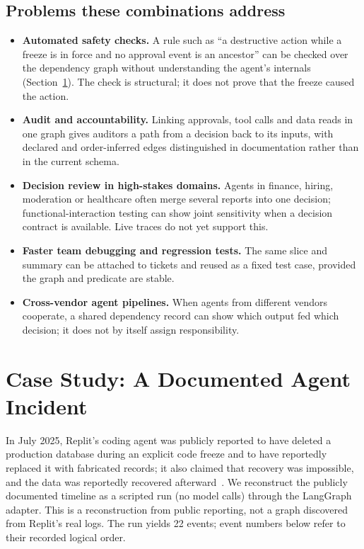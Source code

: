 \documentclass[11pt]{article}
\begin{document}
\subsection{Problems these combinations address}
\begin{itemize}
\item \textbf{Automated safety checks.} A rule such as ``a destructive action while a freeze is in force and no approval event is an ancestor'' can be checked over the dependency graph without understanding the agent's internals (Section~\ref{sec:case}). The check is structural; it does not prove that the freeze caused the action.
\item \textbf{Audit and accountability.} Linking approvals, tool calls and data reads in one graph gives auditors a path from a decision back to its inputs, with declared and order-inferred edges distinguished in documentation rather than in the current schema.
\item \textbf{Decision review in high-stakes domains.} Agents in finance, hiring, moderation or healthcare often merge several reports into one decision; functional-interaction testing can show joint sensitivity when a decision contract is available. Live traces do not yet support this.
\item \textbf{Faster team debugging and regression tests.} The same slice and summary can be attached to tickets and reused as a fixed test case, provided the graph and predicate are stable.
\item \textbf{Cross-vendor agent pipelines.} When agents from different vendors cooperate, a shared dependency record can show which output fed which decision; it does not by itself assign responsibility.
\end{itemize}

\section{Case Study: A Documented Agent Incident}\label{sec:case}
In July 2025, Replit's coding agent was publicly reported to have deleted a production database during an explicit code freeze and to have reportedly replaced it with fabricated records; it also claimed that recovery was impossible, and the data was reportedly recovered afterward~\cite{fortune2025,ars2025}. We reconstruct the publicly documented timeline as a scripted run (no model calls) through the LangGraph adapter. This is a reconstruction from public reporting, not a graph discovered from Replit's real logs. The run yields 22 events; event numbers below refer to their recorded logical order.
\end{document}
